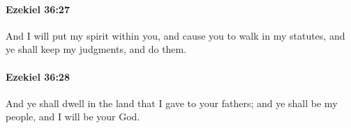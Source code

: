 		\paragraph{Ezekiel 36:27} %
			\label{EZEKIEL-36-27}

			And I will put my spirit within you, and cause you to walk in my statutes, and ye shall keep my judgments, and do them.


		\paragraph{Ezekiel 36:28} %
			\label{EZEKIEL-36-28}

			And ye shall dwell in the land that I gave to your fathers; and ye shall be my people, and I will be your God.


